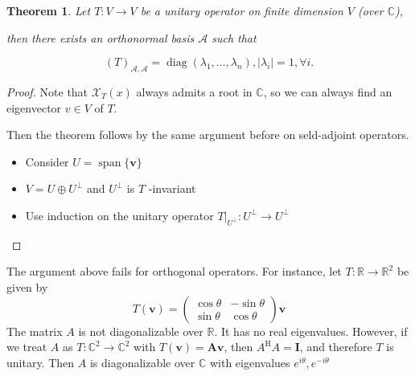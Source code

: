 \documentclass[11pt]{article}
\newtheorem{theorem}{Theorem}[section]
\begin{document}
\begin{theorem} Let \(T : V \rightarrow  V\) be a unitary operator on finite dimension \(V\) (over \(\mathbb{C}\)),

then there exists an orthonormal basis \(\mathcal{A}\) such that

\[
{\left( T\right) }_{\mathcal{A},\mathcal{A}} = \operatorname{diag}\left( {{\lambda }_1,\ldots ,{\lambda }_n}\right) ,\left| {\lambda }_{i}\right|  = 1,\forall i.
\]
\end{theorem}

\begin{proof} Note that \({\mathcal{X}}_{T}\left( x\right)\) always admits a root in \(\mathbb{C}\), so we can always find an eigenvector \(v \in  V\) of \(T\).

Then the theorem follows by the same argument before on seld-adjoint operators.

\begin{itemize}
\item Consider \(U = \operatorname{span}\{ \mathbf{v}\}\)
\end{itemize}

\begin{itemize}
\item \(V = U \oplus  {U}^{ \bot  }\) and \({U}^{ \bot  }\) is \(T\) -invariant
\end{itemize}

\begin{itemize}
\item Use induction on the unitary operator \({\left. T\right| }_{{U}^{ \bot  }} : {U}^{ \bot  } \rightarrow  {U}^{ \bot  }\)
\end{itemize}
\end{proof}

The argument above fails for orthogonal operators. For instance, let \(
T : \mathbb{R} \rightarrow  {\mathbb{R}}^2
\) be given by 
\[
T\left( \mathbf{v}\right)  = \left( \begin{matrix} \cos \theta &  - \sin \theta \\  \sin \theta & \cos \theta  \end{matrix}\right) \mathbf{v}
\]
The matrix \(A\) is not diagonalizable over \(\mathbb{R}\). It has no real eigenvalues. However, if we treat \(A\) as \(T : {\mathbb{C}}^2 \rightarrow  {\mathbb{C}}^2\) with \(T\left( \mathbf{v}\right)  = \mathbf{{Av}}\), then \({A}^{\mathrm{H}}A = \mathbf{I}\), and therefore \(T\) is unitary. Then \(A\) is diagonalizable over \(\mathbb{C}\) with eigenvalues \({e}^{i\theta },{e}^{-{i\theta }}\)
\end{document}
